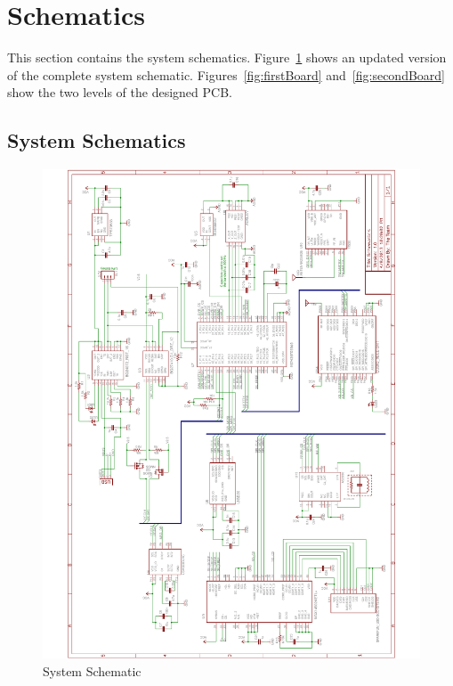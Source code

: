 \section{Schematics}

This section contains the system schematics. Figure~\ref{fig:systemSchematics} shows an updated version of the complete system schematic.  Figures~\ref{fig:firstBoard} and~\ref{fig:secondBoard} show the two levels of the designed PCB. 
\subsection{System Schematics}
\begin{figure}[H]
\centering
	\includegraphics[width=\textwidth]{img/CompleteSchematics}
	\caption{System Schematic \label{fig:systemSchematics}}
\end{figure}

